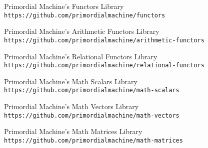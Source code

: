 %
%
%
%
%
%
%

\nocite{*} %

\begin{thebibliography}{9}
Primordial Machine's Functors Library 
\\\texttt{https://github.com/primordialmachine/functors}

Primordial Machine's Arithmetic Functors Library 
\\\texttt{https://github.com/primordialmachine/arithmetic-functors}

Primordial Machine's Relational Functors Library 
\\\texttt{https://github.com/primordialmachine/relational-functors}

Primordial Machine's Math Scalars Library 
\\\texttt{https://github.com/primordialmachine/math-scalars}

Primordial Machine's Math Vectors Library 
\\\texttt{https://github.com/primordialmachine/math-vectors}

Primordial Machine's Math Matrices Library 
\\\texttt{https://github.com/primordialmachine/math-matrices}


\end{thebibliography}
